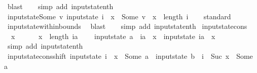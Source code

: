 \begin{isabellebody}
\ blast\isanewline
\ \ \isamarkupfalse%
\ {\isacharparenleft}simp\ add{\isacharcolon}\ input{}state{\isacharunderscore}nth{\isacharparenright}%
\endisatagproof
{\isafoldproof}%
%
\isadelimproof
\isanewline
%
\endisadelimproof
\isanewline
{}\isamarkupfalse%
\ input{}state{\isacharunderscore}Some{\isacharcolon}\ {\isachardoublequoteopen}{\isacharparenleft}{\isasymexists}v{\isachardot}\ input{}state\ i\ {\isachardollar}\ x\ {\isacharequal}\ Some\ v{\isacharparenright}\ {\isacharequal}\ {\isacharparenleft}x\ {\isacharless}\ length\ i{\isacharparenright}{\isachardoublequoteclose}\isanewline
%
\isadelimproof
\ \ %
\endisadelimproof
%
\isatagproof
{}\isamarkupfalse%
\ standard\isanewline
\ \ \isamarkupfalse%
\ input{}state{\isacharunderscore}within{\isacharunderscore}bounds\ \isamarkupfalse%
\ blast\isanewline
\ \ \isamarkupfalse%
\ {\isacharparenleft}simp\ add{\isacharcolon}\ input{}state{\isacharunderscore}nth{\isacharparenright}%
\endisatagproof
{\isafoldproof}%
%
\isadelimproof
\isanewline
%
\endisadelimproof
\isanewline
{}\isamarkupfalse%
\ input{}state{\isacharunderscore}cons{\isacharcolon}\isanewline
\ \ {\isachardoublequoteopen}x{}\ {\isachargreater}\ {}\ {\isasymLongrightarrow}\isanewline
\ \ \ x{}\ {\isacharless}\ length\ ia\ {\isasymLongrightarrow}\isanewline
\ \ \ input{}state\ {\isacharparenleft}a\ {\isacharhash}\ ia{\isacharparenright}\ {\isachardollar}\ x{}\ {\isacharequal}\ input{}state\ ia\ {\isachardollar}\ {\isacharparenleft}x{}{\isacharminus}{}{\isacharparenright}{\isachardoublequoteclose}\isanewline
%
\isadelimproof
\ \ %
\endisadelimproof
%
\isatagproof
{}\isamarkupfalse%
\ {\isacharparenleft}simp\ add{\isacharcolon}\ input{}state{\isacharunderscore}nth{\isacharparenright}%
\endisatagproof
{\isafoldproof}%
%
\isadelimproof
\isanewline
%
\endisadelimproof
\isanewline
{}\isamarkupfalse%
\ input{}state{\isacharunderscore}cons{\isacharunderscore}shift{\isacharcolon}\ {\isachardoublequoteopen}input{}state\ i\ {\isachardollar}\ x{}\ {\isacharequal}\ Some\ a\ {\isasymLongrightarrow}\ input{}state\ {\isacharparenleft}b\ {\isacharhash}\ i{\isacharparenright}\ {\isachardollar}\ {\isacharparenleft}Suc\ x{}{\isacharparenright}\ {\isacharequal}\ Some\ a{\isachardoublequoteclose}\isanewline

\end{isabellebody}
